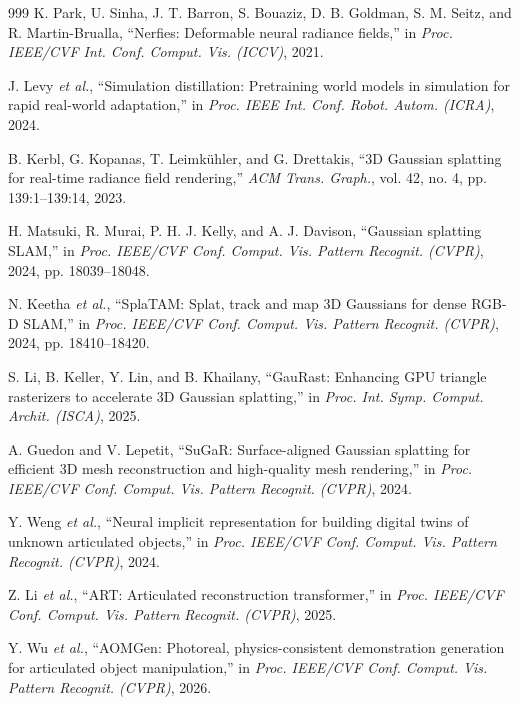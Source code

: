 \documentclass[12pt,a4paper,oneside]{report}
\begin{document}
\begin{thebibliography}{999}
K. Park, U. Sinha, J. T. Barron, S. Bouaziz, D. B. Goldman, S. M. Seitz, and R. Martin-Brualla, ``Nerfies: Deformable neural radiance fields,'' in \textit{Proc. IEEE/CVF Int. Conf. Comput. Vis. (ICCV)}, 2021.

J. Levy \textit{et al.}, ``Simulation distillation: Pretraining world models in simulation for rapid real-world adaptation,'' in \textit{Proc. IEEE Int. Conf. Robot. Autom. (ICRA)}, 2024.

B. Kerbl, G. Kopanas, T. Leimk\"{u}hler, and G. Drettakis, ``{3D} Gaussian splatting for real-time radiance field rendering,'' \textit{ACM Trans. Graph.}, vol. 42, no. 4, pp. 139:1--139:14, 2023.

H. Matsuki, R. Murai, P. H. J. Kelly, and A. J. Davison, ``Gaussian splatting {SLAM},'' in \textit{Proc. IEEE/CVF Conf. Comput. Vis. Pattern Recognit. (CVPR)}, 2024, pp. 18039--18048.

N. Keetha \textit{et al.}, ``{SplaTAM}: Splat, track and map {3D} Gaussians for dense {RGB-D SLAM},'' in \textit{Proc. IEEE/CVF Conf. Comput. Vis. Pattern Recognit. (CVPR)}, 2024, pp. 18410--18420.

S. Li, B. Keller, Y. Lin, and B. Khailany, ``{GauRast}: Enhancing {GPU} triangle rasterizers to accelerate {3D} Gaussian splatting,'' in \textit{Proc. Int. Symp. Comput. Archit. (ISCA)}, 2025.

A. Guedon and V. Lepetit, ``{SuGaR}: Surface-aligned {Gaussian} splatting for efficient {3D} mesh reconstruction and high-quality mesh rendering,'' in \textit{Proc. IEEE/CVF Conf. Comput. Vis. Pattern Recognit. (CVPR)}, 2024.

Y. Weng \textit{et al.}, ``Neural implicit representation for building digital twins of unknown articulated objects,'' in \textit{Proc. IEEE/CVF Conf. Comput. Vis. Pattern Recognit. (CVPR)}, 2024.

Z. Li \textit{et al.}, ``{ART}: Articulated reconstruction transformer,'' in \textit{Proc. IEEE/CVF Conf. Comput. Vis. Pattern Recognit. (CVPR)}, 2025.

Y. Wu \textit{et al.}, ``{AOMGen}: Photoreal, physics-consistent demonstration generation for articulated object manipulation,'' in \textit{Proc. IEEE/CVF Conf. Comput. Vis. Pattern Recognit. (CVPR)}, 2026.


\end{thebibliography}
\end{document}
